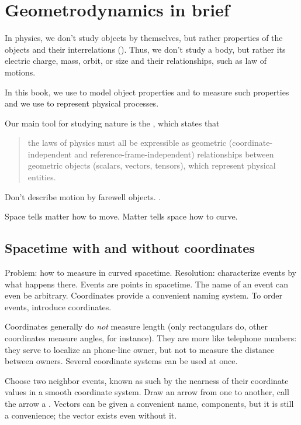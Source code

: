 
\section{Geometrodynamics in brief}

In physics, we don't study objects by themselves, but rather  properties of the objects and their interrelations (). Thus, we don't study a body, but rather its electric charge, mass, orbit, or size and their relationships, such as law of motions. 

In this book, we use  to model object properties and to measure such properties and we use  to represent physical processes.

Our main tool for studying nature is the , which states that
%
\begin{quotation}
the laws of physics must all be expressible as geometric (coordinate-independent and reference-frame-independent) relationships between geometric objects (scalars, vectors, tensors), which represent physical entities.
\end{quotation}

Don't describe motion by farewell objects. .

Space tells matter how to move. Matter tells space how to curve.


\subsection{Spacetime with and without coordinates}

Problem: how to measure in curved spacetime. Resolution: characterize events by what happens there. Events are points in spacetime. The name of an event can even be arbitrary. Coordinates provide a convenient naming system. To order events, introduce coordinates.

Coordinates generally do \emph{not} measure length (only rectangulars do, other coordinates measure angles, for instance). They are more like telephone numbers: they serve to localize an phone-line owner, but not to measure the distance between owners. Several coordinate systems can be used at once.

Choose two neighbor events, known as such by the nearness of their coordinate values in a smooth coordinate system. Draw an arrow from one to another, call the arrow a . Vectors can be given a convenient name, components, but it is still a convenience; the vector exists even without it.

